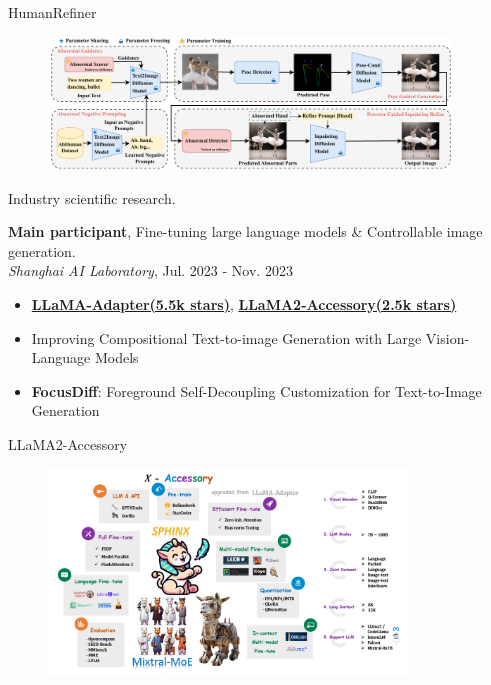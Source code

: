 \documentclass[8pt]{beamer}
\begin{document}
\begin{frame}{HumanRefiner}
    \begin{figure}
        \centering
\includegraphics[width=0.95\textwidth]{demo/framework_v4.pdf}
    \end{figure}
\end{frame}
\begin{frame}{Industry scientific research.}

\textbf{Main participant}, Fine-tuning large language models \& Controllable image generation.\\
\textit{Shanghai AI Laboratory}, Jul. 2023 - Nov. 2023
\begin{itemize}
\item \href{https://github.com/OpenGVLab/LLaMA-Adapter}{\textbf{LLaMA-Adapter(5.5k stars)}}, \href{https://github.com/Alpha-VLLM/LLaMA2-Accessory}{\textbf{LLaMA2-Accessory(2.5k stars)}}
\item {Improving Compositional Text-to-image Generation with Large Vision-Language Models}
        \item {\textbf{FocusDiff}: Foreground Self-Decoupling Customization for Text-to-Image Generation}
\end{itemize}
\end{frame}
\begin{frame}{LLaMA2-Accessory}
    \begin{figure}
        \centering
        \includegraphics[width=0.85\textwidth]{demo/logo.png}
    \end{figure}
\end{frame}
\end{document}
